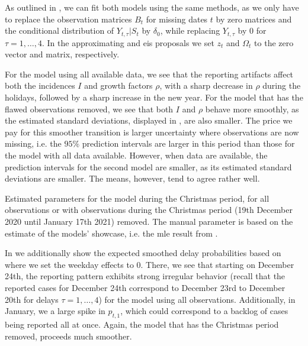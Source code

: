 As outlined in , we can fit both models using the same methods, as we only have to replace the observation matrices $B_{t}$ for missing dates $t$ by zero matrices and the conditional distribution of $Y_{t, \tau} | S_{t}$ by $\delta_{0}$, while replacing $Y_{t,\tau}$ by $0$ for $\tau = 1, \dots, 4$. In the approximating  and \acrshort{eis} proposals we set $z_{t}$ and $\Omega_{t}$ to the zero vector and matrix, respectively. 

For the model using all available data, we see that the reporting artifacts affect both the incidences $I$ and growth factors $\rho$, with a sharp decrease in $\rho$ during the holidays, followed by a sharp increase in the new year. For the model that has the flawed observations removed, we see that both $I$ and $\rho$ behave more smoothly, as the estimated standard deviations, displayed in , are also smaller. The price we pay for this smoother transition is larger uncertainty where observations are now missing, i.e. the $95\%$ prediction intervals are larger in this period than those for the model with all data available. However, when data are available, the prediction intervals for the second model are smaller, as its estimated standard deviations are smaller. The means, however, tend to agree rather well. 

\begin{table}
    \centering
    
    \caption{Estimated parameters for the model during the Christmas period, for all observations or with observations during the Christmas period (19th December 2020 until January 17th 2021) removed. The manual parameter is based on the estimate of the models' showcase, i.e. the \acrshort{mle} result from .}
    \label{tab:christmas-parameters}
\end{table}

In  we additionally show the expected smoothed delay probabilities based on  where we set the weekday effects to $0$. There, we see that starting on December 24th, the reporting pattern exhibits strong irregular behavior (recall that the reported cases for December 24th correspond to December 23rd to December 20th for delays $\tau =1, \dots, 4$) for the model using all observations. Additionally, in January, we a large spike in $p_{t,1}$, which could correspond to a backlog of cases being reported all at once. Again, the model that has the Christmas period removed, proceeds much smoother.

